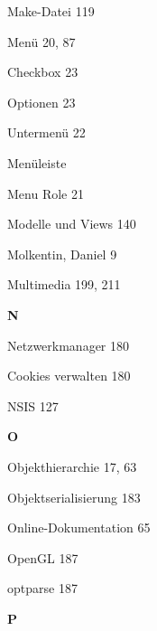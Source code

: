 \documentclass{book}
\renewcommand\indexspace{\vspace{11pt}}
\renewcommand\subitem{\par}
\begin{document}
\begin{multicols}{2}
\begin{osp-index}
  \item Make-Datei\hspace{1mm} 119
  \item Men\"u\hspace{1mm} 20, 87
    \subitem Checkbox\hspace{1mm} 23
    \subitem Optionen\hspace{1mm} 23
    \subitem Untermen\"u\hspace{1mm} 22
  \item Men\"uleiste\hspace{1mm} 
  \item Menu Role\hspace{1mm} 21
  \item Modelle und Views\hspace{1mm} 140
  \item Molkentin, Daniel\hspace{1mm} 9
  \item Multimedia\hspace{1mm} 199, 211

  \indexspace
{\sffamily\bfseries N}\nopagebreak

  \item Netzwerkmanager\hspace{1mm} 180
    \subitem Cookies verwalten\hspace{1mm} 180
  \item NSIS\hspace{1mm} 127

  \indexspace
{\sffamily\bfseries O}\nopagebreak

  \item Objekthierarchie\hspace{1mm} 17, 63
  \item Objektserialisierung\hspace{1mm} 183
  \item Online-Dokumentation\hspace{1mm} 65
  \item OpenGL\hspace{1mm} 187
  \item optparse\hspace{1mm} 187

  \indexspace
{\sffamily\bfseries P}\nopagebreak


\end{osp-index}
\end{multicols}
\end{document}
